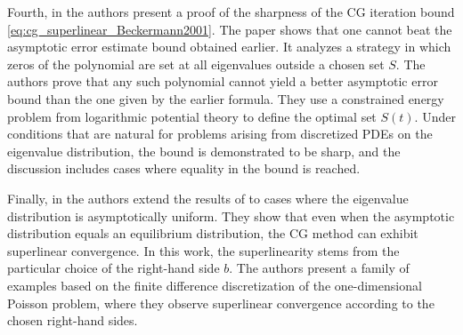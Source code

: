 Fourth, in \cite{cg_sharp_bound_Beckermann2001} the authors present a proof of the sharpness of the CG iteration bound \cref{eq:cg_superlinear_Beckermann2001}. The paper shows that one cannot beat the asymptotic error estimate bound obtained earlier. It analyzes a strategy in which zeros of the polynomial are set at all eigenvalues outside a chosen set \(S\). The authors prove that any such polynomial cannot yield a better asymptotic error bound than the one given by the earlier formula. They use a constrained energy problem from logarithmic potential theory to define the optimal set \(S(t)\). Under conditions that are natural for problems arising from discretized PDEs on the eigenvalue distribution, the bound is demonstrated to be sharp, and the discussion includes cases where equality in the bound is reached.

Finally, in \cite{cg_superlinear_rhs_Beckermann2002} the authors extend the results of \cite{cg_superlinear_Beckermann2001} to cases where the eigenvalue distribution is asymptotically uniform. They show that even when the asymptotic distribution equals an equilibrium distribution, the CG method can exhibit superlinear convergence. In this work, the superlinearity stems from the particular choice of the right-hand side \(b\). The authors present a family of examples based on the finite difference discretization of the one-dimensional Poisson problem, where they observe superlinear convergence according to the chosen right-hand sides.
